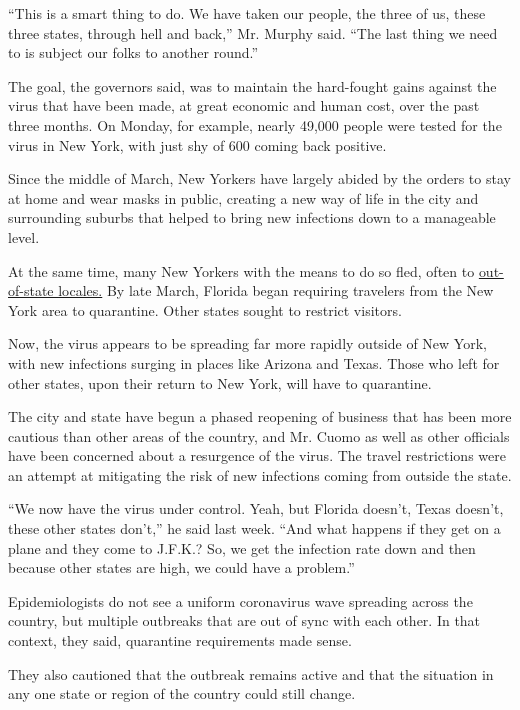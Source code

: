 ``This is a smart thing to do. We have taken our people, the three of
us, these three states, through hell and back,'' Mr. Murphy said. ``The
last thing we need to is subject our folks to another round.''

The goal, the governors said, was to maintain the hard-fought gains
against the virus that have been made, at great economic and human cost,
over the past three months. On Monday, for example, nearly 49,000 people
were tested for the virus in New York, with just shy of 600 coming back
positive.

Since the middle of March, New Yorkers have largely abided by the orders
to stay at home and wear masks in public, creating a new way of life in
the city and surrounding suburbs that helped to bring new infections
down to a manageable level.

At the same time, many New Yorkers with the means to do so fled, often
to
\href{https://www.nytimes3xbfgragh.onion/interactive/2020/05/16/nyregion/nyc-coronavirus-moving-leaving.html}{out-of-state
locales.} By late March, Florida began requiring travelers from the New
York area to quarantine. Other states sought to restrict visitors.

Now, the virus appears to be spreading far more rapidly outside of New
York, with new infections surging in places like Arizona and Texas.
Those who left for other states, upon their return to New York, will
have to quarantine.

The city and state have begun a phased reopening of business that has
been more cautious than other areas of the country, and Mr. Cuomo as
well as other officials have been concerned about a resurgence of the
virus. The travel restrictions were an attempt at mitigating the risk of
new infections coming from outside the state.

``We now have the virus under control. Yeah, but Florida doesn't, Texas
doesn't, these other states don't,'' he said last week. ``And what
happens if they get on a plane and they come to J.F.K.? So, we get the
infection rate down and then because other states are high, we could
have a problem.''

Epidemiologists do not see a uniform coronavirus wave spreading across
the country, but multiple outbreaks that are out of sync with each
other. In that context, they said, quarantine requirements made sense.

They also cautioned that the outbreak remains active and that the
situation in any one state or region of the country could still change.

